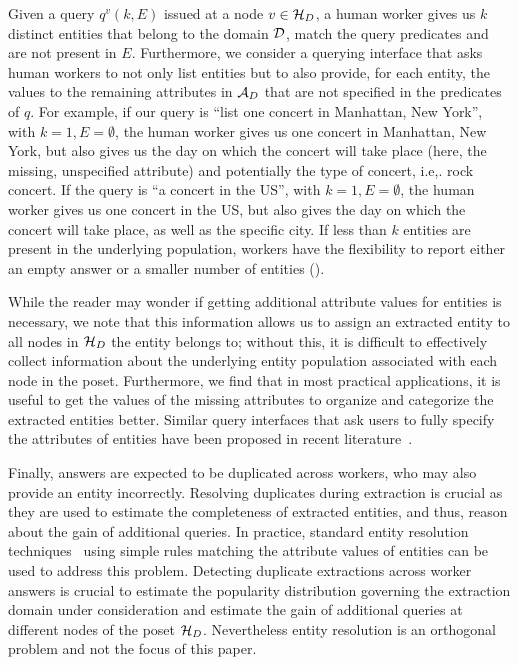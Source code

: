  Given a query $q^v(k, E)$ issued at a node $v \in \mathcal{H}_D$, a human worker gives us $k$ distinct entities that belong to the domain $\mathcal{D}$, match the query predicates and are not present in $E$. Furthermore, we consider a querying interface that asks human workers to not only list entities but to also provide,  for each entity, the values to the remaining attributes in $\mathcal{A}_D$ that are not specified in the predicates of $q$. For example, if our query is ``list one concert in Manhattan, New York'', with $k = 1, E = \emptyset$, the human worker gives us one concert in Manhattan, New York, but also gives us the day on which the concert will take place (here, the missing, unspecified attribute) and potentially the type of concert, i.e,. rock concert. If the query is ``a concert in the US'', with $k = 1, E = \emptyset$, the human worker gives us one concert in the US, but also gives the day on which the concert will take place, as well as the specific city. If less than $k$ entities are present in the underlying population, workers have the flexibility to report either an empty answer or a smaller number of entities ().

While the reader may wonder if getting additional attribute values for entities is necessary, we note that this information allows us to assign an extracted entity to all nodes in $\mathcal{H}_D$ the entity belongs to; without this, it is difficult to effectively collect information about the underlying entity population associated with each node in the poset. Furthermore, we find that in most practical applications, it is useful to get the values of the missing attributes to organize and categorize the extracted entities better. Similar query interfaces that ask users to fully specify the attributes of entities have been proposed in recent literature~\cite{quinn:2014}. 

\ifpaper {} Finally, answers are expected to be duplicated across workers, who may also provide an entity incorrectly. Resolving duplicates during extraction is crucial as they are used to estimate the completeness of extracted entities, and thus, reason about the gain of additional queries. In practice, standard entity resolution techniques~\cite{getoor:kdd13} using simple rules matching the attribute values of entities can be used to address this problem. Detecting duplicate extractions across worker answers is crucial to estimate the popularity distribution governing the extraction domain under consideration and estimate the gain of additional queries at different nodes of the poset $\mathcal{H}_D$. Nevertheless entity resolution is an orthogonal problem and not the focus of this paper. \fi

